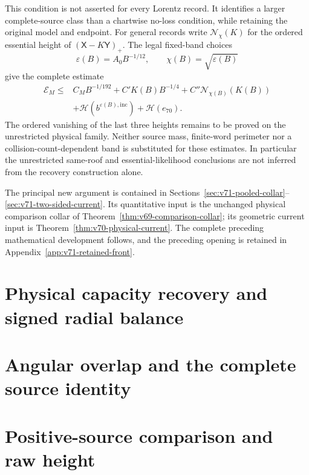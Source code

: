 \documentclass[11pt,reqno]{amsart}
\numberwithin{equation}{section}
\theoremstyle{definition}\newtheorem{definition}[theorem]{Definition}
\theoremstyle{remark}\newtheorem{remark}[theorem]{Remark}
\begin{document}
This condition is not asserted for every Lorentz record. It identifies
a larger complete-source class than a chartwise no-loss condition,
while retaining the original model and endpoint. For general records
write $\mathcal N_\chi(K)$ for the ordered essential height of
$(\mathsf X-K\mathsf Y)_+$. The legal fixed-band choices
\[
 \varepsilon(B)=A_0B^{-1/12},\qquad
                   \chi(B)=\sqrt{\varepsilon(B)}
\]
give the complete estimate
\begin{equation}\label{eq:intro-v71-budget}
 \begin{split}
 \mathcal E_M\le{}&C_MB^{-1/192}+C'K(B)B^{-1/4}
                    +C''\mathcal N_{\chi(B)}(K(B))\\
                 &+\mathcal H(b^{\varepsilon(B),\mathrm{inc}})
                    +\mathcal H(e_{70}).
 \end{split}
\end{equation}
The ordered vanishing of the last three heights remains to be proved
on the unrestricted physical family. Neither source mass, finite-word
perimeter nor a collision-count-dependent band is substituted for
these estimates. In particular the unrestricted same-roof and
essential-likelihood conclusions are not inferred from the recovery
construction alone.

The principal new argument is contained in
Sections~\ref{sec:v71-pooled-collar}--\ref{sec:v71-two-sided-current}.
Its quantitative input is the unchanged physical comparison collar
of Theorem~\ref{thm:v69-comparison-collar}; its geometric current
input is Theorem~\ref{thm:v70-physical-current}. The complete
preceding mathematical development follows, and the preceding opening
is retained in Appendix~\ref{app:v71-retained-front}.

\part{Physical capacity recovery and signed radial balance}


\part{Angular overlap and the complete source identity}



\part{Positive-source comparison and raw height}



\end{document}
